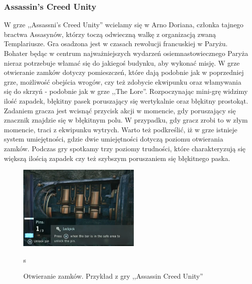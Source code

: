 \documentclass[oneside,polski,logo]{amuthesis}
\begin{document}
\subsubsection{Assassin's Creed Unity}
\par W grze ,,Assassni's Creed Unity'' wcielamy się w Arno Doriana, członka tajnego bractwa Assasynów, którzy toczą odwieczną walkę z organizacją zwaną Templariusze. Gra osadzona jest w czasach rewolucji francuskiej w Paryżu. Bohater będąc w centrum najważniejszych wydarzeń osiemnastowiecznego Paryża nieraz potrzebuje włamać się do jakiegoś budynku, aby wykonać misję. W grze otwieranie zamków dotyczy pomieszczeń, które dają podobnie jak w poprzedniej grze, możliwość obejścia wrogów, czy też zdobycie ekwipunku oraz włamywania się do skrzyń - podobnie jak w grze ,,The Lore''. Rozpoczynając mini-grę widzimy ilość zapadek, błękitny pasek poruszający się wertykalnie oraz błękitny prostokąt. Zadaniem gracza jest wcisnąć przycisk akcji w momencie, gdy poruszający się znacznik znajdzie się w błękitnym polu. W przypadku, gdy gracz zrobi to w złym momencie, traci z ekwipunku wytrych. Warto też podkreślić, iż w grze istnieje system umiejętności, gdzie dwie umiejętności dotyczą poziomu otwierania zamków. Podczas gry spotkamy trzy poziomy trudności, które charakteryzują się większą ilością zapadek czy też szybszym poruszaniem się błękitnego paska. \cite{acu}
\begin{figure}[h]
	\centering
	\includegraphics[width=6cm]{images/tyrek/acu.png}
	\caption{Otwieranie zamków. Przykład z gry ,,Assassin Creed Unity''}s
\end{figure}
\end{document}
